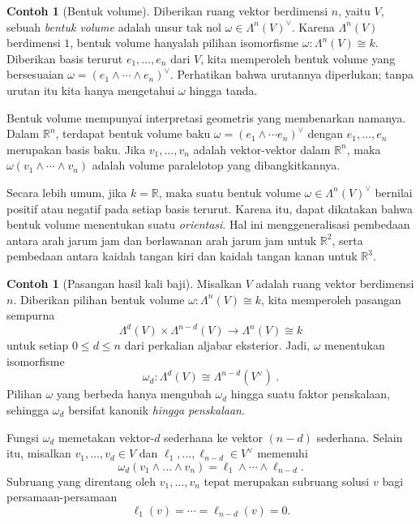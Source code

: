 \documentclass[12pt]{article}
\theoremstyle{plain}
\theoremstyle{definition}
\newtheorem{example}[theorem]{Contoh}
\theoremstyle{remark}
\numberwithin{equation}{section}
\begin{document}
\begin{example}[Bentuk volume]
Diberikan ruang vektor berdimensi $n$, yaitu $V$,
sebuah \emph{bentuk volume} adalah unsur tak nol $\omega \in \Lambda^n(V)^\vee$.
Karena $\Lambda^n(V)$ berdimensi $1$, bentuk volume hanyalah
pilihan isomorfisme $\omega : \Lambda^n(V) \cong k$.
Diberikan basis terurut $e_1,\ldots, e_n$ dari $V$,
kita memperoleh bentuk volume yang bersesuaian
$\omega = (e_1 \wedge \cdots \wedge e_n)^\vee$.
Perhatikan bahwa urutannya diperlukan; tanpa urutan itu kita hanya mengetahui $\omega$
hingga tanda.

Bentuk volume mempunyai interpretasi geometris yang membenarkan namanya.
Dalam $\mathbb{R}^n$, terdapat bentuk volume baku
$\omega=(e_1\wedge \cdots e_n)^\vee$ dengan
$e_1,\ldots,e_n$ merupakan basis baku.
Jika $v_1,\ldots,v_n$ adalah vektor-vektor dalam $\mathbb{R}^n$,
maka $\omega(v_1\wedge \cdots \wedge v_n)$ adalah volume
paralelotop yang dibangkitkannya. 

Secara lebih umum, jika $k=\mathbb{R}$,
maka suatu bentuk volume $\omega \in \Lambda^n(V)^\vee$
bernilai positif atau negatif pada setiap basis terurut.
Karena itu, dapat dikatakan bahwa bentuk volume menentukan suatu
\emph{orientasi}.
Hal ini menggeneralisasi pembedaan antara arah jarum jam dan berlawanan arah jarum jam
untuk $\mathbb{R}^2$, serta pembedaan antara kaidah tangan kiri dan kaidah
tangan kanan untuk $\mathbb{R}^3$.
\end{example}

\begin{example}[Pasangan hasil kali baji]
Misalkan $V$ adalah ruang vektor berdimensi $n$.
Diberikan pilihan bentuk volume $\omega : \Lambda^n(V) \cong k$,
kita memperoleh pasangan sempurna
\[
\Lambda^d(V) \times \Lambda^{n-d}(V) \to
\Lambda^n(V) \cong k
\]
untuk setiap $0 \le d \le n$ dari perkalian aljabar eksterior.
Jadi, $\omega$ menentukan isomorfisme
\[
\omega_d : \Lambda^d(V) \cong \Lambda^{n-d}(V^\vee) \ .
\]
Pilihan $\omega$ yang berbeda hanya mengubah $\omega_d$ hingga suatu faktor
penskalaan, sehingga $\omega_d$ bersifat kanonik \emph{hingga penskalaan}.

Fungsi $\omega_d$ memetakan vektor-$d$ sederhana ke vektor
$(n-d)$ sederhana. Selain itu, misalkan $v_1,\ldots,v_d \in V$
dan $\ell_1,\ldots,\ell_{n-d} \in V^\vee$ memenuhi
\[
\omega_d(v_1 \wedge \ldots \wedge v_n) = \ell_1 \wedge \cdots \wedge
\ell_{n-d} .
\]
Subruang yang direntang oleh $v_1,\ldots,v_n$ tepat merupakan subruang
solusi $v$ bagi persamaan-persamaan
\[
\ell_1(v)=\cdots=\ell_{n-d}(v)=0 .
\]
\end{example}




\end{document}
